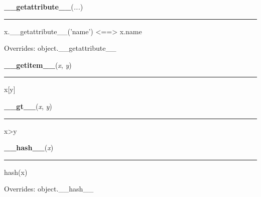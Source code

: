     \begin{boxedminipage}{\textwidth}

    \raggedright \textbf{\_\_getattribute\_\_}(\textit{...})

    \vspace{-1.5ex}

    \rule{\textwidth}{0.5\fboxrule}
    x.\_\_getattribute\_\_('name') {\textless}=={\textgreater} x.name

    \vspace{1ex}

      Overrides: object.\_\_getattribute\_\_

    \end{boxedminipage}

    \label{dict:__getitem__}

    \vspace{0.5ex}

    \begin{boxedminipage}{\textwidth}

    \raggedright \textbf{\_\_getitem\_\_}(\textit{x}, \textit{y})

    \vspace{-1.5ex}

    \rule{\textwidth}{0.5\fboxrule}
    x[y]

    \vspace{1ex}

    \end{boxedminipage}

    \label{dict:__gt__}

    \vspace{0.5ex}

    \begin{boxedminipage}{\textwidth}

    \raggedright \textbf{\_\_gt\_\_}(\textit{x}, \textit{y})

    \vspace{-1.5ex}

    \rule{\textwidth}{0.5\fboxrule}
    x{\textgreater}y

    \vspace{1ex}

    \end{boxedminipage}

    \vspace{0.5ex}

    \begin{boxedminipage}{\textwidth}

    \raggedright \textbf{\_\_hash\_\_}(\textit{x})

    \vspace{-1.5ex}

    \rule{\textwidth}{0.5\fboxrule}
    hash(x)

    \vspace{1ex}

      Overrides: object.\_\_hash\_\_

    \end{boxedminipage}

